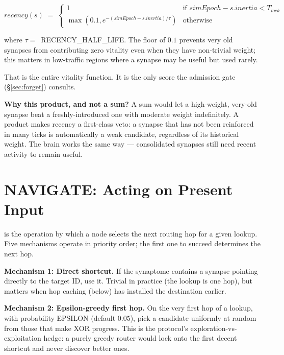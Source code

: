 \documentclass[twoside,nobib]{tufte-book}
\begin{document}
\begin{equation}
  \mathit{recency}(s) \;=\;
  \begin{cases}
    1 & \text{if } \mathit{simEpoch} - s.\mathit{inertia} < \mathit{T_{lock}} \\
    \max(0.1, e^{-(\mathit{simEpoch} - s.\mathit{inertia}) / \tau})
      & \text{otherwise}
  \end{cases}
\end{equation}

where $\tau =$~\textsc{RECENCY\_HALF\_LIFE}. The floor of $0.1$
prevents very old synapses from contributing zero vitality even
when they have non-trivial weight; this matters in low-traffic
regions where a synapse may be useful but used rarely.

That is the entire vitality function. It is the only score the
admission gate (\S\ref{sec:forget}) consults.

\textbf{Why this product, and not a sum?} A sum would let a
high-weight, very-old synapse beat a freshly-introduced one with
moderate weight indefinitely. A product makes recency a
first-class veto: a synapse that has not been reinforced in many
ticks is automatically a weak candidate, regardless of its
historical weight. The brain works the same way --- consolidated
synapses still need recent activity to remain useful.

\section{NAVIGATE: Acting on Present Input}
\label{sec:navigate}

 is the operation by which a node selects
the next routing hop for a given lookup. Five mechanisms operate
in priority order; the first one to succeed determines the next
hop.

\textbf{Mechanism 1: Direct shortcut.} If the synaptome contains
a synapse pointing directly to the target ID, use it. Trivial in
practice (the lookup is one hop), but matters when hop caching
(below) has installed the destination earlier.

\textbf{Mechanism 2: Epsilon-greedy first hop.} On the very first
hop of a lookup, with probability \textsc{EPSILON} (default
$0.05$), pick a candidate uniformly at random from those that
make XOR progress. This is the protocol's exploration-vs-exploitation
hedge: a purely greedy router would lock onto the first decent
shortcut and never discover better ones.
\end{document}
